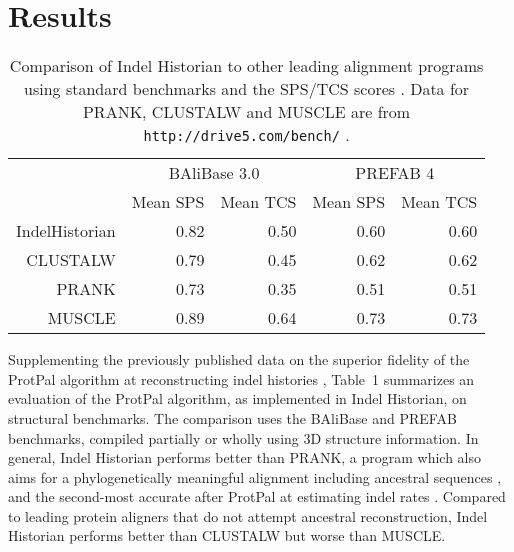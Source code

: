 \documentclass{bioinfo}
\begin{document}
\section{Results}

\begin{table}
  \begin{tabular}{r|rr|rr}
    & \multicolumn{2}{c|}{BAliBase 3.0} & \multicolumn{2}{c}{PREFAB 4} \\
    & Mean SPS & Mean TCS & Mean SPS & Mean TCS \\
    \hline
IndelHistorian & 0.82 & 0.50 & 0.60 & 0.60 \\
CLUSTALW & 0.79 & 0.45 & 0.62 & 0.62 \\
PRANK & 0.73 & 0.35 & 0.51 & 0.51 \\
MUSCLE & 0.89 & 0.64 & 0.73 & 0.73 \\
  \end{tabular}
  \caption{
    Comparison of Indel Historian to other leading alignment programs using standard benchmarks
    and the SPS/TCS scores \citep{ThompsonEtAl2005}.
    Data for PRANK, CLUSTALW and MUSCLE are from {\tt http://drive5.com/bench/} \citep{Edgar2010}.
  }
\end{table}

Supplementing the previously published data on the superior fidelity of the ProtPal algorithm
at reconstructing indel histories \citep{Westesson2012-zg},
Table~1 summarizes an evaluation of the ProtPal algorithm, as implemented in Indel Historian, on structural benchmarks.
The comparison uses the BAliBase and PREFAB
benchmarks, compiled partially or wholly using 3D structure information.
In general, Indel Historian performs better than PRANK,
a program which also aims for a phylogenetically meaningful alignment
including ancestral sequences \citep{LoytynojaGoldman2008},
and the second-most accurate after ProtPal at estimating indel rates \citep{Westesson2012-zg}.
Compared to leading protein aligners that do not attempt ancestral reconstruction, Indel Historian performs better than CLUSTALW but worse than MUSCLE.

% 
% 
% 
\end{document}
